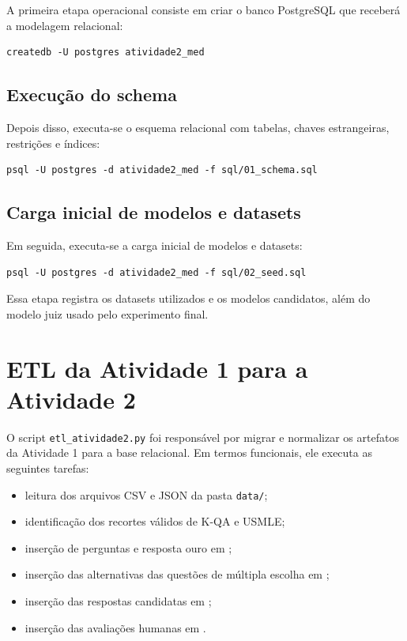 \documentclass[12pt,a4paper]{article}
\begin{document}
A primeira etapa operacional consiste em criar o banco PostgreSQL que receberá a modelagem relacional:

\begin{lstlisting}[caption={Criacao do banco PostgreSQL}]
createdb -U postgres atividade2_med
\end{lstlisting}

\subsection{Execução do schema}

Depois disso, executa-se o esquema relacional com tabelas, chaves estrangeiras, restrições e índices:

\begin{lstlisting}[caption={Carga do schema relacional}]
psql -U postgres -d atividade2_med -f sql/01_schema.sql
\end{lstlisting}

\subsection{Carga inicial de modelos e datasets}

Em seguida, executa-se a carga inicial de modelos e datasets:

\begin{lstlisting}[caption={Carga inicial de modelos e datasets}]
psql -U postgres -d atividade2_med -f sql/02_seed.sql
\end{lstlisting}

Essa etapa registra os datasets utilizados e os modelos candidatos, além do modelo juiz usado pelo experimento final.

\section{ETL da Atividade 1 para a Atividade 2}

O script \texttt{etl\_atividade2.py} foi responsável por migrar e normalizar os artefatos da Atividade 1 para a base relacional. Em termos funcionais, ele executa as seguintes tarefas:

\begin{itemize}[leftmargin=1.2cm]
    \item leitura dos arquivos CSV e JSON da pasta \texttt{data/};
    \item identificação dos recortes válidos de K-QA e USMLE;
    \item inserção de perguntas e resposta ouro em ;
    \item inserção das alternativas das questões de múltipla escolha em ;
    \item inserção das respostas candidatas em ;
    \item inserção das avaliações humanas em . 
\end{itemize}
\end{document}
